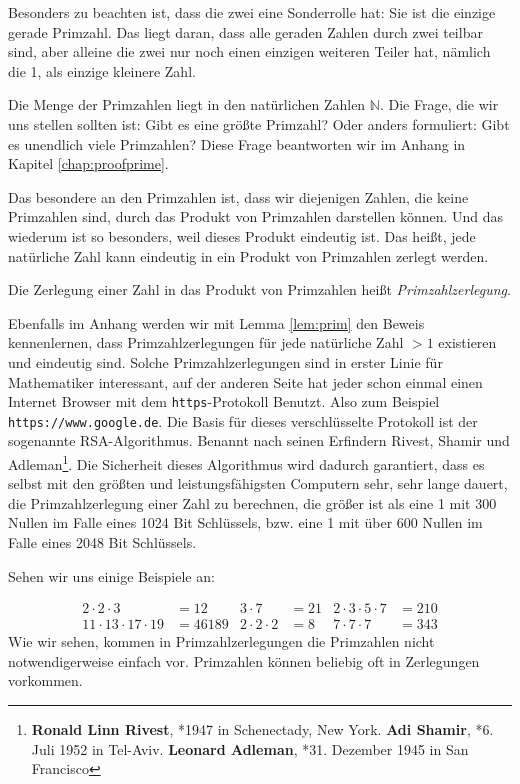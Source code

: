 Besonders zu beachten ist, dass die zwei eine Sonderrolle hat: Sie ist die einzige gerade Primzahl. Das liegt daran, dass alle geraden Zahlen durch zwei teilbar sind, aber alleine die zwei nur noch einen einzigen weiteren Teiler hat, nämlich die 1, als einzige kleinere Zahl.

Die Menge der Primzahlen liegt in den natürlichen Zahlen $\mathbb{N}$. Die Frage, die wir uns stellen sollten ist: Gibt es eine größte Primzahl? Oder anders formuliert: Gibt es unendlich viele Primzahlen? Diese Frage beantworten wir im Anhang in Kapitel \ref{chap:proofprime}.

Das besondere an den Primzahlen ist, dass wir diejenigen Zahlen, die keine Primzahlen sind, durch das Produkt von Primzahlen darstellen können. Und das wiederum ist so besonders, weil dieses Produkt eindeutig ist. Das heißt, jede natürliche Zahl kann eindeutig in ein Produkt von Primzahlen zerlegt werden.

\begin{definition}
Die Zerlegung einer Zahl in das Produkt von Primzahlen heißt \textsl{Primzahlzerlegung}.
\end{definition}

Ebenfalls im Anhang werden wir mit Lemma \ref{lem:prim} den Beweis kennenlernen, dass Primzahlzerlegungen für jede natürliche Zahl $>1$ existieren und eindeutig sind. Solche Primzahlzerlegungen sind in erster Linie für Mathematiker interessant, auf der anderen Seite hat jeder schon einmal einen Internet Browser mit dem \texttt{https}-Protokoll Benutzt. Also zum Beispiel \texttt{https://www.google.de}. Die Basis für dieses verschlüsselte Protokoll ist der sogenannte RSA-Algorithmus. Benannt nach seinen Erfindern Rivest, Shamir und Adleman\footnote{\textbf{Ronald Linn Rivest}, *1947 in Schenectady, New York. \textbf{Adi Shamir}, *6. Juli 1952 in Tel-Aviv. \textbf{Leonard Adleman}, *31. Dezember 1945 in San Francisco}. Die Sicherheit dieses Algorithmus wird dadurch garantiert, dass es selbst mit den größten und leistungsfähigsten Computern sehr, sehr lange dauert, die Primzahlzerlegung einer Zahl zu berechnen, die größer ist als eine 1 mit 300 Nullen im Falle eines 1024 Bit Schlüssels, bzw. eine 1 mit über 600 Nullen im Falle eines 2048 Bit Schlüssels.

Sehen wir uns einige Beispiele an: 

\begin{align*}
2\cdot 2\cdot 3 &= 12 & 3\cdot 7 &= 21 & 2\cdot 3\cdot 5\cdot 7 &= 210 \\
11\cdot 13\cdot 17\cdot 19 &= 46189 & 2\cdot 2\cdot 2 &= 8 & 7\cdot 7\cdot 7 &= 343
\end{align*}
Wie wir sehen, kommen in Primzahlzerlegungen die Primzahlen nicht notwendigerweise einfach vor. Primzahlen können beliebig oft in Zerlegungen vorkommen.

